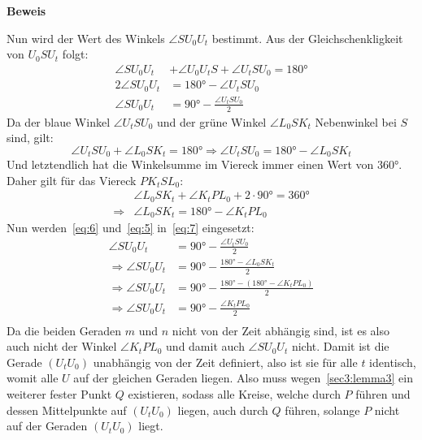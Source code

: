 \documentclass[10pt, a4paper, reqno]{amsart}
\makeatletter
\renewcommand\proofname{Beweis}
\renewenvironment{proof}[1][\proofname]{\par
\pushQED{\qed}%
\normalfont \topsep6\p@\@plus6\p@\relax
\trivlist
\item\relax
{\bfseries#1}\hspace\labelsep\ignorespaces
}{%
\popQED\endtrivlist\@endpefalse
}
\makeatother
\begin{document}
\begin{proof}
  Nun wird der Wert des Winkels $\angle SU_0U_t$ bestimmt. Aus der
  Gleichschenkligkeit von $U_0SU_t$ folgt:
  \begin{equation}
    \label{eq:7}
    \begin{split}
      \angle SU_0U_t& +\angle U_0U_tS + \angle U_tSU_0 = 180°\\
      2\angle SU_0U_t&= 180° - \angle U_tSU_0\\
      \angle SU_0U_t&= 90° - \frac{\angle U_tSU_0}{2}
    \end{split}
  \end{equation}
  Da der blaue Winkel $\angle U_tSU_0$ und der grüne Winkel $\angle L_0SK_t$
  Nebenwinkel bei $S$ sind, gilt:
  \begin{equation}
    \label{eq:5}
    \angle U_tSU_0 + \angle L_0SK_t = 180° \Rightarrow \angle U_tSU_0 = 180° - \angle L_0SK_t
  \end{equation}
  Und letztendlich hat die Winkelsumme im Viereck immer einen Wert von $360°$.
  Daher gilt für das Viereck $PK_tSL_0$:
  \begin{equation}
    \label{eq:6}
    \begin{split}
      &\angle L_0SK_t + \angle K_tPL_0 + 2\cdot 90° = 360°\\
      \Rightarrow &\angle L_0SK_t= 180° - \angle K_tPL_0
    \end{split}
  \end{equation}
  Nun werden~\eqref{eq:6} und~\eqref{eq:5} in~\eqref{eq:7} eingesetzt:
\begin{align*}
    \angle SU_0U_t &= 90° -\frac{\angle U_tSU_0}{2}\\
    \Rightarrow \angle SU_0U_t &= 90° -\frac{180°-\angle L_0SK_t}{2}\\
    \Rightarrow \angle SU_0U_t &= 90° -\frac{180°-(180° - \angle K_tPL_0)}{2}\\
    \Rightarrow \angle SU_0U_t &= 90° -\frac{\angle K_tPL_0}{2}\\
  \end{align*}
  Da die beiden Geraden $m$ und $n$ nicht von der Zeit abhängig sind, ist es
  also auch nicht der Winkel $\angle K_tPL_0$ und damit auch $\angle SU_0U_t$ nicht.
  Damit ist die Gerade $(U_tU_0)$ unabhängig von der Zeit definiert, also ist
  sie für alle $t$ identisch, womit alle $U$ auf der gleichen Geraden liegen.
  Also muss wegen~\autoref{sec3:lemma3} ein weiterer fester Punkt
  $Q$ existieren, sodass alle Kreise, welche durch $P$ führen und dessen
  Mittelpunkte auf $(U_tU_0)$ liegen, auch durch $Q$ führen, solange
  $P$ nicht auf der Geraden $(U_tU_0)$ liegt.


\end{proof}
\end{document}
